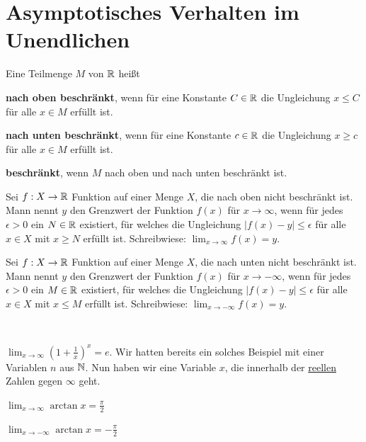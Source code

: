 \section{Asymptotisches Verhalten im Unendlichen} 

\begin{defn}
	Eine Teilmenge $M$ von $\mathbb{R}$ heißt
	\begin{enuma}
		\item \textbf{nach oben beschränkt}, wenn für eine Konstante $C \in \mathbb{R}$ die Ungleichung $x \le C$ für alle $x \in M$ erfüllt ist. 
		\item \textbf{nach unten beschränkt}, wenn für eine Konstante $c \in \mathbb{R}$ die Ungleichung $x \ge c$ für alle $x \in M$ erfüllt ist. 
		\item \textbf{beschränkt}, wenn $M$ nach oben und nach unten beschränkt ist. 
	\end{enuma}
\end{defn} 

\begin{defn}
	Sei $f : X \to \mathbb{R}$ Funktion auf einer Menge $X$, die nach oben nicht beschränkt ist. Mann nennt 
	$y$ den Grenzwert der Funktion $f(x)$ für $x \to \infty$, wenn für jedes $\epsilon>0$ ein $N \in \mathbb{R}$ existiert, für welches die Ungleichung $|f(x) - y| \le \epsilon$ für alle $x \in X$ mit $x \ge N$ erfüllt ist. Schreibwiese: $\lim_{x \to \infty} f(x) = y$. 
\end{defn} 

\begin{defn}
	Sei $f : X \to \mathbb{R}$ Funktion auf einer Menge $X$, die nach unten nicht beschränkt ist. Mann nennt 
	$y$ den Grenzwert der Funktion $f(x)$ für $x \to -\infty$, wenn für jedes $\epsilon>0$ ein $M \in \mathbb{R}$ existiert, für welches die Ungleichung $|f(x) - y| \le \epsilon$ für alle $x \in X$ mit $x \le M$ erfüllt ist. Schreibwiese: $\lim_{x \to -\infty} f(x) = y$. 
\end{defn} 

\begin{bsp} { \ } 
	\begin{enuma}
		\item $\lim_{x \to \infty} \left( 1 + \frac{1}{x} \right)^x = e$. Wir hatten bereits ein solches Beispiel mit einer Variablen $n$ aus $\mathbb{N}$. Nun haben wir eine Variable $x$, die innerhalb der \underline{reellen} Zahlen gegen $\infty$ geht. 
		\item $\lim_{x \to \infty} \arctan x  = \frac{\pi}{2}$ 
		\item $\lim_{x \to -\infty} \arctan x  = - \frac{\pi}{2}$ 
	\end{enuma} 
\end{bsp} 


